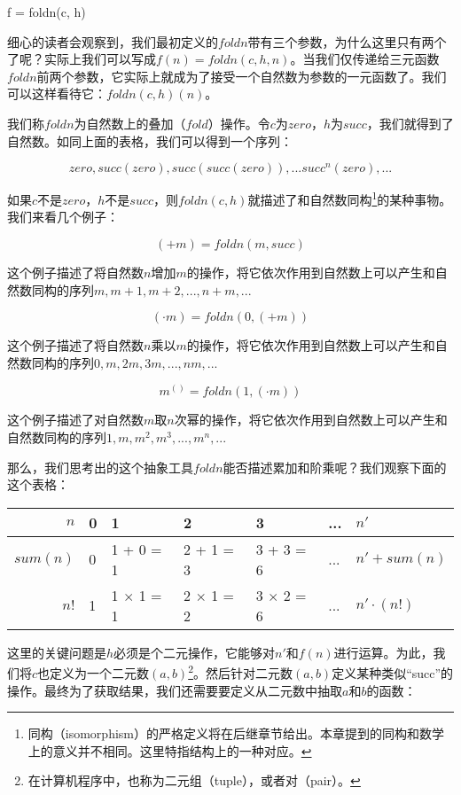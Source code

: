 \documentclass[UTF8]{article}
\begin{document}
\be
f = foldn(c, h)
\ee

细心的读者会观察到，我们最初定义的$foldn$带有三个参数，为什么这里只有两个了呢？实际上我们可以写成$f(n) = foldn(c, h, n)$。当我们仅传递给三元函数$foldn$前两个参数，它实际上就成为了接受一个自然数为参数的一元函数了。我们可以这样看待它：$foldn(c, h)(n)$。

我们称$foldn$为自然数上的叠加（$fold$）操作。令$c$为$zero$，$h$为$succ$，我们就得到了自然数。如同上面的表格，我们可以得到一个序列：

\[
zero, succ(zero), succ(succ(zero)), ... succ^n(zero), ...
\]

如果$c$不是$zero$，$h$不是$succ$，则$foldn(c, h)$就描述了和自然数同构\footnote{同构（isomorphism）的严格定义将在后继章节给出。本章提到的同构和数学上的意义并不相同。这里特指结构上的一种对应。}的某种事物。我们来看几个例子：

\[
(+ m) = foldn(m, succ)
\]

这个例子描述了将自然数$n$增加$m$的操作，将它依次作用到自然数上可以产生和自然数同构的序列$m, m + 1, m + 2, ..., n + m, ...$

\[
(\cdot m) = foldn(0, (+ m))
\]

这个例子描述了将自然数$n$乘以$m$的操作，将它依次作用到自然数上可以产生和自然数同构的序列$0, m, 2m, 3m, ..., nm, ...$

\[
m^{()} = foldn(1, (\cdot m))
\]

这个例子描述了对自然数$m$取$n$次幂的操作，将它依次作用到自然数上可以产生和自然数同构的序列$1, m, m^2, m^3, ..., m^n, ...$

那么，我们思考出的这个抽象工具$foldn$能否描述累加和阶乘呢？我们观察下面的这个表格：

\vspace{5mm}
\begin{tabular}{r|l|l|l|l|l|l}
$n$ & 0 & 1 & 2 & 3 & ... & $n'$ \\
\hline
$sum(n)$ & 0 & 1 + 0 = 1 & 2 + 1 = 3 & 3 + 3 = 6 & ... & $n' + sum(n)$ \\
\hline
$n!$ & 1 & 1 $\times$ 1 = 1 & 2 $\times$ 1 = 2 & 3 $\times$ 2 = 6 & ... & $n' \cdot (n!)$
\end{tabular}
\vspace{5mm}

这里的关键问题是$h$必须是个二元操作，它能够对$n'$和$f(n)$进行运算。为此，我们将$c$也定义为一个二元数$(a, b)$\footnote{在计算机程序中，也称为二元组（tuple），或者对（pair）。}。然后针对二元数$(a, b)$定义某种类似“succ”的操作。最终为了获取结果，我们还需要要定义从二元数中抽取$a$和$b$的函数：
\end{document}
